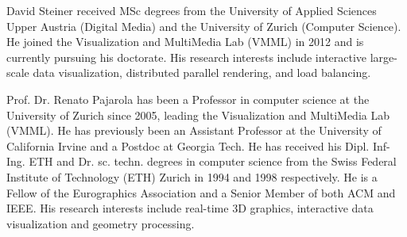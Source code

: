 \documentclass[10pt,journal,compsoc]{IEEEtran}
\begin{document}
\begin{IEEEbiography}{David Steiner}
received MSc degrees from the University of Applied Sciences Upper Austria (Digital Media) and the University of Zurich (Computer Science). He joined the Visualization and MultiMedia Lab (VMML) in 2012 and is currently pursuing his doctorate. His research interests include interactive large-scale data visualization, distributed parallel rendering, and load balancing.
\end{IEEEbiography}

\begin{IEEEbiography}{Prof. Dr. Renato Pajarola}
has been a Professor in computer science at the University of Zurich since 2005, leading the Visualization and MultiMedia Lab (VMML). He has previously been an Assistant Professor at the University of California Irvine and a Postdoc at Georgia Tech. He has received his Dipl. Inf-Ing. ETH and Dr. sc. techn. degrees in computer science from the Swiss Federal Institute of Technology (ETH) Zurich in 1994 and 1998 respectively. He is a Fellow of the Eurographics Association and a Senior Member of both ACM and IEEE. His research interests include real-time 3D graphics, interactive data visualization and geometry processing.
\end{IEEEbiography}




\end{document}
